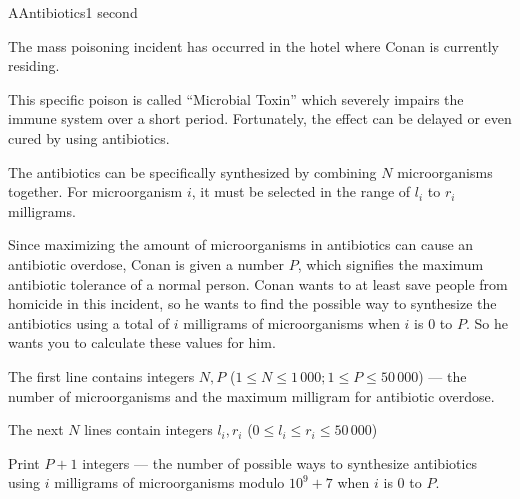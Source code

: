 \begin{problem}{A}{Antibiotics}{1 second}

\noindent
The mass poisoning incident has occurred in the hotel where Conan is currently residing.

\noindent
This specific poison is called ``Microbial Toxin'' which severely impairs the immune system over a short period. Fortunately, the effect can be delayed or even cured by using antibiotics.

\noindent
The antibiotics can be specifically synthesized by combining $N$ microorganisms together. For microorganism $i$, it must be selected in the range of $l_i$ to $r_i$ milligrams.

\noindent
Since maximizing the amount of microorganisms in antibiotics can cause an antibiotic overdose, Conan is given a number $P$, which signifies the maximum antibiotic tolerance of a normal person. Conan wants to at least save people from homicide in this incident, so he wants to find the possible way to synthesize the antibiotics using a total of $i$ milligrams of microorganisms when $i$ is $0$ to $P$. So he wants you to calculate these values for him.

\InputFile

\noindent
The first line contains integers $N,P$ ($1 \le N \le 1\,000;1 \le P \le 50\,000$) --- the number of microorganisms and the maximum milligram for antibiotic overdose.

\noindent
The next $N$ lines contain integers $l_i,r_i$ ($0 \le l_i \le r_i \le 50\,000$)

\OutputFile

\noindent
Print $P+1$ integers --- the number of possible ways to synthesize antibiotics using $i$ milligrams of microorganisms modulo $10^9+7$ when $i$ is $0$ to $P$.

\Examples

\begin{example}
\end{example}

\pagebreak

\end{problem}